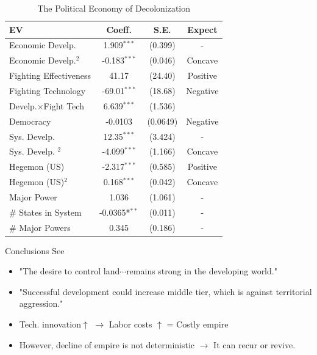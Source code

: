 \documentclass[xcolor=dvipsnames]{beamer}
\begin{document}
	\begin{frame}
		\begin{table}[ht]
			\small
			\centering
			\begin{tabular}[t]{lccc}
				\toprule
				EV						&Coeff.					&S.E.		&Expect		\\
				\midrule
				Economic Develp.		&1.909$^{***}$			&(0.399)	&  - 		\\
				Economic Develp.$^2$	&-0.183$^{***}$			&(0.046)	& Concave	\\
				Fighting Effectiveness	&41.17					&(24.40)	& Positive	\\
				Fighting Technology		&-69.01$^{***}$			&(18.68)	& Negative	\\
				Develp.$\times$Fight Tech&6.639$^{***}$			&(1.536)	& 			\\
				Democracy				&-0.0103				&(0.0649)	& Negative	\\
				Sys. Develp.			&12.35$^{***}$			&(3.424)	& - 		\\
				Sys. Develp.	$^2$	&-4.099$^{***}$			&(1.166)	& Concave	\\
				Hegemon (US)			&-2.317$^{***}$			&(0.585)	& Positive	\\
				Hegemon (US)$^2$		&0.168$^{***}$			&(0.042)	& Concave 	\\
				Major Power				&1.036					&(1.061)	& -  		\\
				\# States in System		&-0.0365*$^{**}$		&(0.011)	& -  		\\
				\# Major Powers			&0.345					&(0.186)	& - 		\\
				\bottomrule
			\end{tabular}
			\caption{The Political Economy of Decolonization}
		\end{table}
	\end{frame}
	
	
	\begin{frame}[fragile]{Conclusions}
		See \citet[555-556]{Gartzke2011}
		\begin{itemize}
			\item "The desire to control land$\cdots$remains strong in the developing world."
			\item "Successful development could increase middle tier, which is against territorial aggression."
			\item Tech. innovation$\uparrow$ $\rightarrow$ Labor costs $\uparrow$ = Costly empire
			\item However, decline of empire is not deterministic $\rightarrow$ It can recur or revive.
		\end{itemize}
	\end{frame}
	
\end{document}
